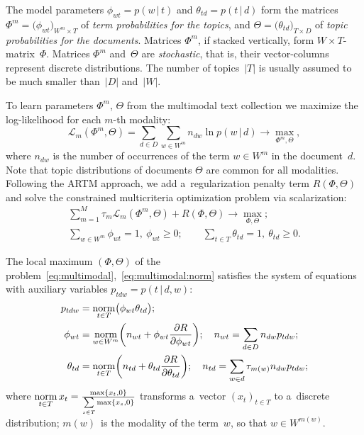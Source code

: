 \documentclass[russian]{llncs}
\newcommand{\norm}{\mathop{\rm norm}\limits}
\newcommand{\cond}{\mspace{3mu}{|}\mspace{3mu}}
\newcommand{\cL}{\mathscr{L}}
\begin{document}
The model parameters
$\phi_{wt}=p(w\cond t)$ and $\theta_{td}=p(t\cond d)$
form the matrices
$\Phi^m = \bigl( \phi_{wt} \bigr)_{W^m\times T}$ of \emph{term probabilities for the topics}, and
$\Theta = \bigl( \theta_{td} \bigr)_{T\times D}$ of \emph{topic probabilities for the documents}.
Matrices $\Phi^m$, if stacked vertically, form ${W\!\!\times\!T}$-matrix~$\Phi$.
Matrices $\Phi^m$ and~$\Theta$ are \emph{stochastic},
that is, their vector-columns represent discrete distributions.
The number of topics~$|T|$ is usually assumed to be much smaller than~$|D|$ and~$|W|$.

To learn parameters $\Phi^m$, $\Theta$ from the multimodal text collection
we maximize the log-likelihood for each $m$-th modality:
\[
    \cL_m (\Phi^m,\Theta) =
    \sum_{d\in D}\sum_{w\in W^m} n_{dw} \ln p(w\cond d)
    \to \max_{\Phi^m,\Theta},
\]
where
$n_{dw}$ is the number of occurrences of the term $w\in W^m$ in the document~$d$.
Note that topic distributions of documents $\Theta$ are common for all modalities.
Following the ARTM approach,
we add a~regularization penalty term $R(\Phi,\Theta)$
and solve the constrained multicriteria optimization problem via scalarization:
\begin{gather}
\label{eq:multimodal}
    \sum_{m=1}^M \tau_m \cL_m (\Phi^m,\Theta)
    + R(\Phi,\Theta)
    \to \max_{\Phi,\Theta};
\\\label{eq:multimodal:norm}
    \sum_{w\in W^m}\!\!\! \phi_{wt} = 1,~
    \phi_{wt}\geq 0;
    \qquad
    \sum_{t\in T} \theta_{td} = 1,~
    \theta_{td}\geq 0.
\end{gather}

The local maximum $(\Phi,\Theta)$
of the problem~\eqref{eq:multimodal},~\eqref{eq:multimodal:norm}
satisfies the system of equations
with auxiliary variables $p_{tdw} = p(t\cond d,w)$:
\begin{align}
    \label{eq:Estep}
    p_{tdw} &= \norm_{t\in T} \bigl(\phi_{wt}\theta_{td}\bigr);
\\
    \label{eq:Mstep:phi}
    \phi_{wt} &= \norm_{w\in W^m}
        \biggl(
            n_{wt} + \phi_{wt} \frac{\partial R}{\partial \phi_{wt}}
        \biggr);
    \quad
    n_{wt} = \sum_{d\in D} n_{dw} p_{tdw};
\\
    \label{eq:Mstep:theta}
    \theta_{td} &= \norm_{t\in T}
        \biggl(
            n_{td} + \theta_{td} \frac{\partial R}{\partial \theta_{td}}
        \biggr);
    \quad
    n_{td} =
        \sum_{w\in d} \tau_{m(w)} n_{dw} p_{tdw};
\end{align}
where
$\norm_{t\in T} x_t = \frac{\max\{x_t,0\}}{\sum\limits_{s\in T} \max\{x_s,0\}}$
transforms a~vector $(x_t)_{t\in T}$ to a~discrete distribution;
$m(w)$~is the modality of the term~$w$, so that $w\in W^{m(w)}$.
\end{document}
